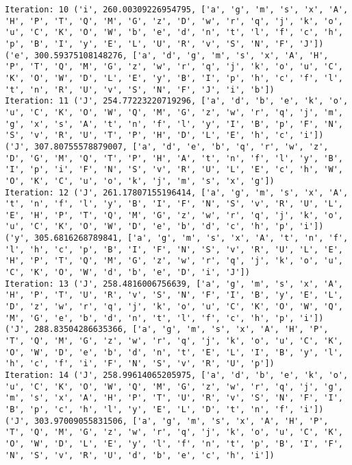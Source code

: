 \documentclass[english,man]{apa6}
\begin{document}
\begin{verbatim}
Iteration: 10 ('i', 260.00309226954795, ['a', 'g', 'm', 's', 'x', 'A', 'H', 'P', 'T', 'Q', 'M', 'G', 'z', 'D', 'w', 'r', 'q', 'j', 'k', 'o', 'u', 'C', 'K', 'O', 'W', 'b', 'e', 'd', 'n', 't', 'l', 'f', 'c', 'h', 'p', 'B', 'I', 'y', 'E', 'L', 'U', 'R', 'v', 'S', 'N', 'F', 'J']) ('e', 300.59375108148276, ['a', 'd', 'g', 'm', 's', 'x', 'A', 'H', 'P', 'T', 'Q', 'M', 'G', 'z', 'w', 'r', 'q', 'j', 'k', 'o', 'u', 'C', 'K', 'O', 'W', 'D', 'L', 'E', 'y', 'B', 'I', 'p', 'h', 'c', 'f', 'l', 't', 'n', 'R', 'U', 'v', 'S', 'N', 'F', 'J', 'i', 'b'])
Iteration: 11 ('J', 254.77223220719296, ['a', 'd', 'b', 'e', 'k', 'o', 'u', 'C', 'K', 'O', 'W', 'Q', 'M', 'G', 'z', 'w', 'r', 'q', 'j', 'm', 'g', 'x', 's', 'A', 't', 'n', 'f', 'l', 'y', 'I', 'B', 'p', 'F', 'N', 'S', 'v', 'R', 'U', 'T', 'P', 'H', 'D', 'L', 'E', 'h', 'c', 'i']) ('J', 307.80755578879007, ['a', 'd', 'e', 'b', 'q', 'r', 'w', 'z', 'D', 'G', 'M', 'Q', 'T', 'P', 'H', 'A', 't', 'n', 'f', 'l', 'y', 'B', 'I', 'p', 'i', 'F', 'N', 'S', 'v', 'R', 'U', 'L', 'E', 'c', 'h', 'W', 'O', 'K', 'C', 'u', 'o', 'k', 'j', 'm', 's', 'x', 'g'])
Iteration: 12 ('J', 261.17807155196414, ['a', 'g', 'm', 's', 'x', 'A', 't', 'n', 'f', 'l', 'y', 'B', 'I', 'F', 'N', 'S', 'v', 'R', 'U', 'L', 'E', 'H', 'P', 'T', 'Q', 'M', 'G', 'z', 'w', 'r', 'q', 'j', 'k', 'o', 'u', 'C', 'K', 'O', 'W', 'D', 'e', 'b', 'd', 'c', 'h', 'p', 'i']) ('y', 305.6816268789841, ['a', 'g', 'm', 's', 'x', 'A', 't', 'n', 'f', 'l', 'h', 'c', 'p', 'B', 'I', 'F', 'N', 'S', 'v', 'R', 'U', 'L', 'E', 'H', 'P', 'T', 'Q', 'M', 'G', 'z', 'w', 'r', 'q', 'j', 'k', 'o', 'u', 'C', 'K', 'O', 'W', 'd', 'b', 'e', 'D', 'i', 'J'])
Iteration: 13 ('J', 258.4816006756639, ['a', 'g', 'm', 's', 'x', 'A', 'H', 'P', 'T', 'U', 'R', 'v', 'S', 'N', 'F', 'I', 'B', 'y', 'E', 'L', 'D', 'z', 'w', 'r', 'q', 'j', 'k', 'o', 'u', 'C', 'K', 'O', 'W', 'Q', 'M', 'G', 'e', 'b', 'd', 'n', 't', 'l', 'f', 'c', 'h', 'p', 'i']) ('J', 288.83504286635366, ['a', 'g', 'm', 's', 'x', 'A', 'H', 'P', 'T', 'Q', 'M', 'G', 'z', 'w', 'r', 'q', 'j', 'k', 'o', 'u', 'C', 'K', 'O', 'W', 'D', 'e', 'b', 'd', 'n', 't', 'E', 'L', 'I', 'B', 'y', 'l', 'h', 'c', 'f', 'i', 'F', 'N', 'S', 'v', 'R', 'U', 'p'])
Iteration: 14 ('J', 258.99614065205975, ['a', 'd', 'b', 'e', 'k', 'o', 'u', 'C', 'K', 'O', 'W', 'Q', 'M', 'G', 'z', 'w', 'r', 'q', 'j', 'g', 'm', 's', 'x', 'A', 'H', 'P', 'T', 'U', 'R', 'v', 'S', 'N', 'F', 'I', 'B', 'p', 'c', 'h', 'l', 'y', 'E', 'L', 'D', 't', 'n', 'f', 'i']) ('J', 303.97009055831506, ['a', 'g', 'm', 's', 'x', 'A', 'H', 'P', 'T', 'Q', 'M', 'G', 'z', 'w', 'r', 'q', 'j', 'k', 'o', 'u', 'C', 'K', 'O', 'W', 'D', 'L', 'E', 'y', 'l', 'f', 'n', 't', 'p', 'B', 'I', 'F', 'N', 'S', 'v', 'R', 'U', 'd', 'b', 'e', 'c', 'h', 'i'])

\end{verbatim}
\end{document}
